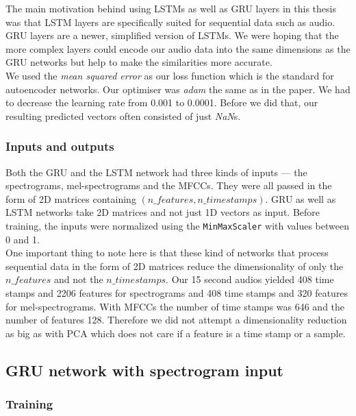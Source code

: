 The main motivation behind using LSTMs as well as GRU layers in this thesis was that LSTM layers are specifically suited for sequential data such as audio. GRU layers are a newer, simplified version of LSTMs. We were hoping that the more complex layers could encode our audio data into the same dimensions as the GRU networks but help to make the similarities more accurate. \\

We used the \textit{mean squared error} as our loss function which is the standard for autoencoder networks. Our optimiser was \textit{adam} the same as in the \cite{inproceedings_RNNs} paper. We had to decrease the learning rate from 0.001 to 0.0001. Before we did that, our resulting predicted vectors often consisted of just \textit{NaN}s.

\subsubsection{Inputs and outputs}
Both the GRU and the LSTM network had three kinds of inputs --- the spectrograms, mel-spectrograms and the MFCCs. They were all passed in the form of 2D matrices containing $(n\_features, n\_timestamps)$. GRU as well as LSTM networks take 2D matrices and not just 1D vectors as input. Before training, the inputs were normalized using the \texttt{MinMaxScaler} with values between 0 and 1. \\
One important thing to note here is that these kind of networks that process sequential data in the form of 2D matrices reduce the dimensionality of only the $ n\_features $ and not the $ n\_timestamps $. Our 15 second audios yielded 408 time stamps and 2206 features for spectrograms and 408 time stamps and 320 features for mel-spectrograms. With MFCCs the number of time stamps was 646 and the number of features 128. Therefore we did not attempt a dimensionality reduction as big as with PCA which does not care if a feature is a time stamp or a sample.

\subsection{GRU network with spectrogram input}

\subsubsection{Training}

